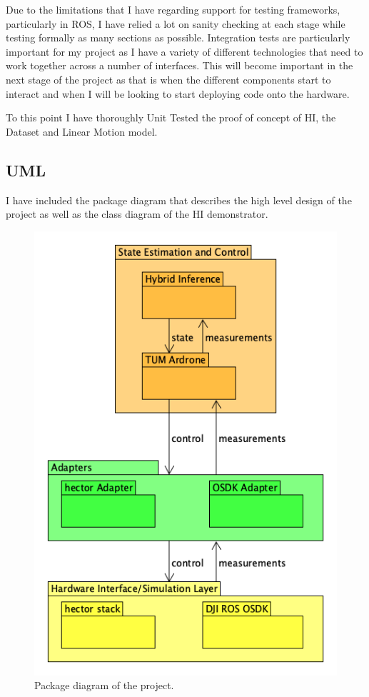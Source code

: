 \documentclass[]{../resources/final_report}
\begin{document}
Due to the limitations that I have regarding support for testing frameworks, particularly in ROS, 
I have relied a lot on sanity checking at each stage while testing formally as many sections as 
possible. Integration tests are particularly important for my project as I have a variety of 
different technologies that need to work together across a number of interfaces.
This will become important in the next stage of the project as that is when the different components 
start to interact and when I will be looking to start deploying code onto the hardware.

To this point I have thoroughly Unit Tested the proof of concept of HI, the 
Dataset and Linear Motion model.

\pagebreak
\subsection{UML}
I have included the package diagram that describes the high level design 
of the project as well as the class diagram of the HI demonstrator.

\begin{figure}[h]
  \centering
  \includegraphics[height=0.30\textheight]{hybrid-inference-package-uml.png}  
  \caption{Package diagram of the project.}
  \label{}
\end{figure}
\end{document}
